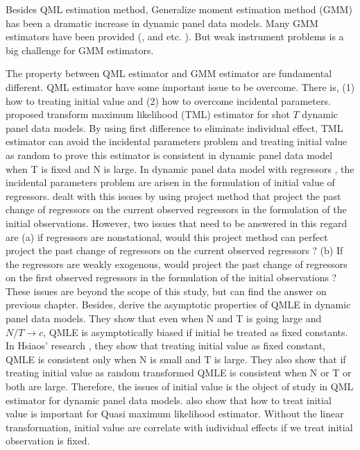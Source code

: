 \documentclass[12pt,a4paper,hyperref]{article}
\begin{document}
Besides QML estimation method, Generalize moment estimation method (GMM) has been a dramatic increase in dynamic panel data models. Many GMM estimators have been provided (\citet{Arellano:1991}, \citet{Arellano:1995} and \citet{Blundell:1998} etc. ). But weak instrument problems is a big challenge for GMM estimators.

The property between QML estimator and GMM estimator are fundamental different.  QML estimator have some important issue to be overcome. There is, (1) how to treating initial value and (2) how to overcome incidental parameters. \citet{Hsiao:2002} proposed transform maximum likelihood (TML) estimator  for shot $T$ dynamic panel data models. By using first difference to eliminate individual effect, TML estimator can avoid the incidental parameters problem and treating initial value as random to prove this estimator is consistent in dynamic panel data model when T is fixed and N is large. In dynamic panel data model with regressors , the incidental parameters problem are arisen in the formulation of initial value of regressors. \citet{Hsiao:2002} dealt with this issues by using project method that project the past change of regressors on the current observed regressors in the formulation of the initial observations.
 However, two issues that need to be answered in this regard are (a) if regressors are nonstational, would this project method can perfect project the past change of regressors on the current observed regressors ? (b) If the regressors are weakly exogenous,  would project the past change of regressors on the first observed regressors in the formulation of the initial observations ? These issues are beyond the scope of this study, but can find the answer on previous chapter. Besides, \citet{Hsiao:2015} derive the asymptotic properties of QMLE in dynamic panel data models. They show that even when N and T is going large and $N/T \rightarrow c$, QMLE is asymptotically biased if initial be treated as fixed constants. In Hsiaos’ research  , they show that treating initial value as fixed constant, QMLE is consistent only when N is small and T is large. They also show that if treating initial value as random transformed QMLE is consistent when N or T or both are large. Therefore, the issues of initial value is the object of study in QML estimator for dynamic panel data models. \citet{Hsiao:2018} also show that how to treat initial value is important for Quasi maximum likelihood estimator. Without the linear transformation, initial value are correlate with individual effects if we treat initial observation is fixed.
\end{document}
